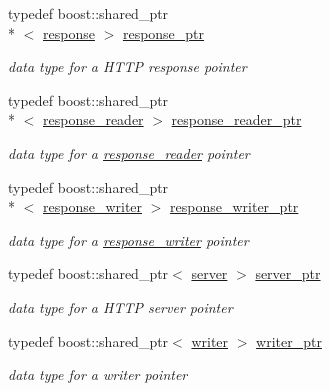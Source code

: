 \begin{DoxyCompactItemize}
typedef boost\-::shared\-\_\-ptr\\*
$<$ \hyperlink{classpion_1_1http_1_1response}{response} $>$ \hyperlink{namespacepion_1_1http_af92bc593f2514fe8733175dafec7cd33}{response\-\_\-ptr}
\begin{DoxyCompactList}\small\item\em data type for a H\-T\-T\-P response pointer \end{DoxyCompactList}\item 
typedef boost\-::shared\-\_\-ptr\\*
$<$ \hyperlink{classpion_1_1http_1_1response__reader}{response\-\_\-reader} $>$ \hyperlink{namespacepion_1_1http_a4110534305b5ec05fdfee095c10af4e7}{response\-\_\-reader\-\_\-ptr}
\begin{DoxyCompactList}\small\item\em data type for a \hyperlink{classpion_1_1http_1_1response__reader}{response\-\_\-reader} pointer \end{DoxyCompactList}\item 
typedef boost\-::shared\-\_\-ptr\\*
$<$ \hyperlink{classpion_1_1http_1_1response__writer}{response\-\_\-writer} $>$ \hyperlink{namespacepion_1_1http_aaf75f88dc37f535e5584e55450257e14}{response\-\_\-writer\-\_\-ptr}
\begin{DoxyCompactList}\small\item\em data type for a \hyperlink{classpion_1_1http_1_1response__writer}{response\-\_\-writer} pointer \end{DoxyCompactList}\item 
typedef boost\-::shared\-\_\-ptr$<$ \hyperlink{classpion_1_1http_1_1server}{server} $>$ \hyperlink{namespacepion_1_1http_a3c92c485d7cc919d4fcaa2128b096382}{server\-\_\-ptr}
\begin{DoxyCompactList}\small\item\em data type for a H\-T\-T\-P server pointer \end{DoxyCompactList}\item 
typedef boost\-::shared\-\_\-ptr$<$ \hyperlink{classpion_1_1http_1_1writer}{writer} $>$ \hyperlink{namespacepion_1_1http_ab8e875e702aba19923014f31d69762df}{writer\-\_\-ptr}
\begin{DoxyCompactList}\small\item\em data type for a writer pointer \end{DoxyCompactList}\end{DoxyCompactItemize}
